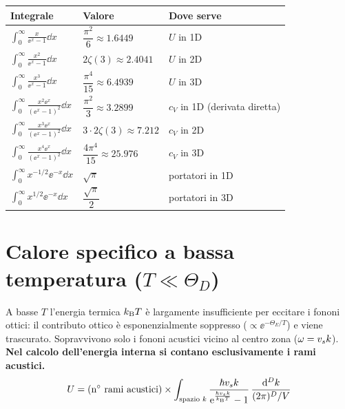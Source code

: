 \begin{center}
\renewcommand{\arraystretch}{2.0}
\begin{tabular}{l l l}
\toprule
Integrale & Valore & Dove serve \\
\midrule
$\displaystyle\int_0^\infty \frac{x}{\ee^x-1}\dd x$ & $\dfrac{\pi^2}{6}\approx 1.6449$ & $U$ in 1D \\
$\displaystyle\int_0^\infty \frac{x^2}{\ee^x-1}\dd x$ & $2\zeta(3)\approx 2.4041$ & $U$ in 2D \\
$\displaystyle\int_0^\infty \frac{x^3}{\ee^x-1}\dd x$ & $\dfrac{\pi^4}{15}\approx 6.4939$ & $U$ in 3D \\
$\displaystyle\int_0^\infty \frac{x^2\ee^x}{(\ee^x-1)^2}\dd x$ & $\dfrac{\pi^2}{3}\approx 3.2899$ & $c_V$ in 1D (derivata diretta) \\
$\displaystyle\int_0^\infty \frac{x^3\ee^x}{(\ee^x-1)^2}\dd x$ & $3\cdot 2\zeta(3)\approx 7.212$ & $c_V$ in 2D \\
$\displaystyle\int_0^\infty \frac{x^4\ee^x}{(\ee^x-1)^2}\dd x$ & $\dfrac{4\pi^4}{15}\approx 25.976$ & $c_V$ in 3D \\
$\displaystyle\int_0^\infty x^{-1/2}\ee^{-x}\dd x$ & $\sqrt{\pi}$ & portatori in 1D \\
$\displaystyle\int_0^\infty x^{1/2}\ee^{-x}\dd x$ & $\dfrac{\sqrt{\pi}}{2}$ & portatori in 3D \\
\bottomrule
\end{tabular}
\end{center}

\newpage
\section{Calore specifico a bassa temperatura ($T \ll \Theta_D$)}
A basse $T$ l'energia termica $k_{\mathrm{B}} T$ è largamente insufficiente per eccitare i fononi ottici: il contributo ottico è esponenzialmente soppresso ($\propto \ee^{-\Theta_E/T}$) e viene trascurato. Sopravvivono solo i fononi acustici vicino al centro zona ($\omega=v_s k$). \textbf{Nel calcolo dell'energia interna si contano esclusivamente i rami acustici.}
\[ U = (\text{n}^\circ\ \text{rami acustici}) \times \int_{\text{spazio } k} \frac{\hbr \vs k}{\ee^{\frac{\hbr \vs k}{\kB T}} - 1}\, \frac{\dd^D k}{(2\pi)^D / V} \]


